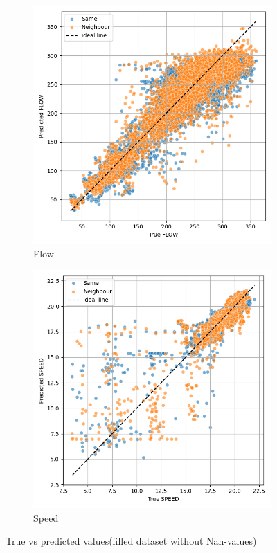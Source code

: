 		\begin{figure}[H]
		\centering
		\begin{subfigure}{0.49 \linewidth}
			\includegraphics[width=\textwidth]{../Plots/Flow/samevsneighbour}
			\caption{Flow}
		\end{subfigure}
		\begin{subfigure}{0.49 \linewidth}
			\includegraphics[width=\textwidth]{../Plots/Speed/samevsneighbour}
			\caption{Speed}
		\end{subfigure}
		\caption{True vs predicted values(filled dataset without Nan-values)}
		\label{fig:samevsneighbour}
	\end{figure}
	
